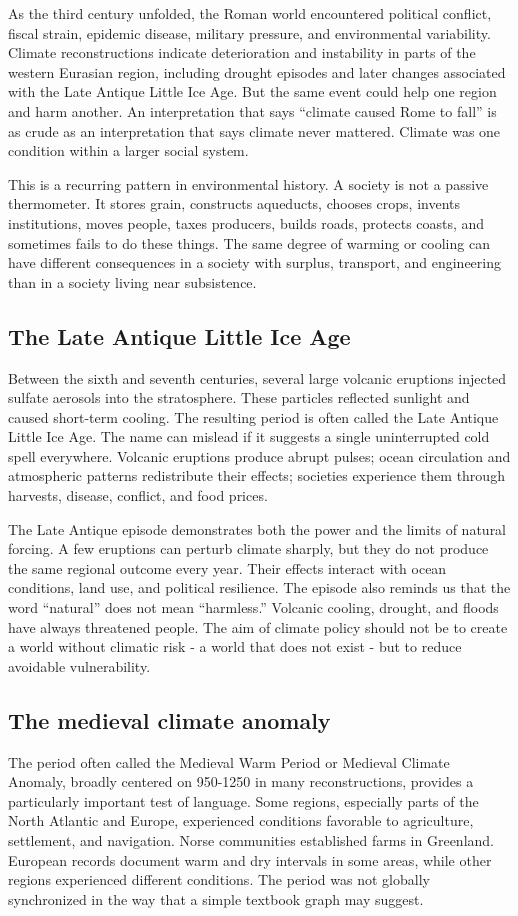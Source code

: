 ﻿\documentclass[12pt,a4paper]{book}
\begin{document}
As the third century unfolded, the Roman world encountered political conflict, fiscal strain, epidemic disease, military pressure, and environmental variability. Climate reconstructions indicate deterioration and instability in parts of the western Eurasian region, including drought episodes and later changes associated with the Late Antique Little Ice Age. But the same event could help one region and harm another. An interpretation that says ``climate caused Rome to fall'' is as crude as an interpretation that says climate never mattered. Climate was one condition within a larger social system. \cite{McCormick2012,Harper2017}

This is a recurring pattern in environmental history. A society is not a passive thermometer. It stores grain, constructs aqueducts, chooses crops, invents institutions, moves people, taxes producers, builds roads, protects coasts, and sometimes fails to do these things. The same degree of warming or cooling can have different consequences in a society with surplus, transport, and engineering than in a society living near subsistence.

\subsection{The Late Antique Little Ice Age}
Between the sixth and seventh centuries, several large volcanic eruptions injected sulfate aerosols into the stratosphere. These particles reflected sunlight and caused short-term cooling. The resulting period is often called the Late Antique Little Ice Age. The name can mislead if it suggests a single uninterrupted cold spell everywhere. Volcanic eruptions produce abrupt pulses; ocean circulation and atmospheric patterns redistribute their effects; societies experience them through harvests, disease, conflict, and food prices.

The Late Antique episode demonstrates both the power and the limits of natural forcing. A few eruptions can perturb climate sharply, but they do not produce the same regional outcome every year. Their effects interact with ocean conditions, land use, and political resilience. The episode also reminds us that the word ``natural'' does not mean ``harmless.'' Volcanic cooling, drought, and floods have always threatened people. The aim of climate policy should not be to create a world without climatic risk - a world that does not exist - but to reduce avoidable vulnerability.

\subsection{The medieval climate anomaly}
The period often called the Medieval Warm Period or Medieval Climate Anomaly, broadly centered on 950-1250 in many reconstructions, provides a particularly important test of language. Some regions, especially parts of the North Atlantic and Europe, experienced conditions favorable to agriculture, settlement, and navigation. Norse communities established farms in Greenland. European records document warm and dry intervals in some areas, while other regions experienced different conditions. The period was not globally synchronized in the way that a simple textbook graph may suggest.
\end{document}
